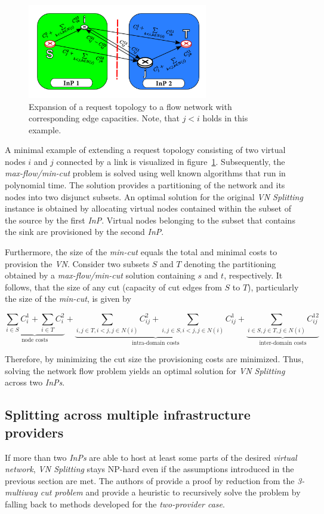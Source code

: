 \documentclass[prodmode,acmtomccap]{acmlarge}
\begin{document}
\begin{figure}[htb]
	\centering
	\includegraphics[width=0.7\textwidth]{maxflow}
	\caption{Expansion of a request topology to a flow network with corresponding edge capacities. Note, that $j < i$ holds in this example.}
	\label{fig5}
\end{figure}

A minimal example of extending a request topology consisting of two virtual nodes $i$ and $j$ connected by a link is visualized in figure~\ref{fig5}.
Subsequently, the \emph{max-flow/min-cut} problem is solved using well known algorithms that run in polynomial time. The solution provides a partitioning of the network and its nodes
into two disjunct subsets. An optimal solution for the original \emph{VN Splitting} instance is obtained by allocating virtual nodes contained within the subset of the source by the first \emph{InP}.
Virtual nodes belonging to the subset that contains the sink are provisioned by the second \emph{InP}.

Furthermore, the size of the \emph{min-cut} equals the total and minimal
costs to provision the \emph{VN}. Consider two subsets $S$ and $T$ denoting the partitioning obtained by a \emph{max-flow/min-cut} solution containing $s$ and $t$, respectively.
It follows, that the size of any cut (capacity of cut edges from $S$ to $T$), particularly the size of the \emph{min-cut}, is given by

$$
	\underbrace{\sum\limits_{i \in S} C_i^1 + \sum\limits_{i \in T} C_i^2}_{\text{node costs}} + 
	\underbrace{\sum\limits_{i,j \in T, i < j, j \in N(i)} C_{ij}^2 + \sum\limits_{i,j \in S, i < j, j \in N(i)} C_{ij}^1}_{\text{intra-domain costs}}
	+\underbrace{\sum\limits_{i \in S, j \in T, j \in N(i)} C_{ij}^{12}}_{\text{inter-domain costs}}
$$

Therefore, by minimizing the cut size the provisioning costs are minimized. Thus, solving the network flow problem yields an optimal solution for \emph{VN Splitting} across two \emph{InPs}.

\subsection{Splitting across multiple infrastructure providers}
If more than two \emph{InPs} are able to host at least some parts of the desired \emph{virtual network}, \emph{VN Splitting} stays NP-hard even if the assumptions introduced in the previous section are met.
The authors of  provide a proof by reduction from the \emph{3-multiway cut problem} and provide a heuristic to recursively solve the problem by falling back to methods developed
for the \emph{two-provider case}.
\end{document}
